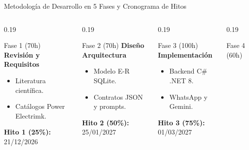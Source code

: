 \documentclass[aspectratio=169, 10pt]{beamer}
\begin{document}
\begin{frame}{Metodología de Desarrollo en 5 Fases y Cronograma de Hitos}
  \begin{columns}[t]
    \begin{column}{0.19\textwidth}
      \begin{block}{\centering Fase 1 (70h)}
        \scriptsize
        \textbf{Revisión y Requisitos}
        \begin{itemize}\setlength{\itemsep}{1pt}
          \item Literatura científica.
          \item Catálogos Power Electrimk.
        \end{itemize}
        \vspace{2pt}
        \textbf{Hito 1 (25\%):} 21/12/2026
      \end{block}
    \end{column}
    \begin{column}{0.19\textwidth}
      \begin{block}{\centering Fase 2 (70h)}
        \scriptsize
        \textbf{Diseño Arquitectura}
        \begin{itemize}\setlength{\itemsep}{1pt}
          \item Modelo E-R SQLite.
          \item Contratos JSON y prompts.
        \end{itemize}
        \vspace{2pt}
        \textbf{Hito 2 (50\%):} 25/01/2027
      \end{block}
    \end{column}
    \begin{column}{0.19\textwidth}
      \begin{block}{\centering Fase 3 (100h)}
        \scriptsize
        \textbf{Implementación}
        \begin{itemize}\setlength{\itemsep}{1pt}
          \item Backend C\# .NET 8.
          \item WhatsApp y Gemini.
        \end{itemize}
        \vspace{2pt}
        \textbf{Hito 3 (75\%):} 01/03/2027
      \end{block}
    \end{column}
    \begin{column}{0.19\textwidth}
      \begin{block}{\centering Fase 4 (60h)}

\end{block}
\end{column}
\end{columns}
\end{frame}
\end{document}
